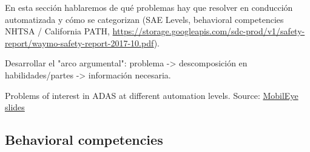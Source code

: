 

En esta sección hablaremos de qué problemas hay que resolver en conducción automatizada y cómo se categorizan (SAE Levels, behavioral competencies NHTSA / California PATH, \url{https://storage.googleapis.com/sdc-prod/v1/safety-report/waymo-safety-report-2017-10.pdf}).

Desarrollar el "arco argumental": problema -> descomposición en habilidades/partes -> información necesaria.

Problems of interest in ADAS at different automation levels.
Source: \href{http://www.mobileye.com/wp-content/uploads/2013/09/AEB_test_procedures_aug12.pdf}{MobilEye slides}

%
%
%
%
%
%

\subsection{Behavioral competencies}


